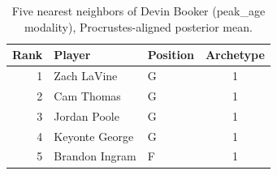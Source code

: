 \begin{table}[htbp]
  \centering\small
  \begin{tabular}{rllc}
    \toprule
    Rank & Player & Position & Archetype \\
    \midrule
    1 & Zach LaVine & G & 1 \\
    2 & Cam Thomas & G & 1 \\
    3 & Jordan Poole & G & 1 \\
    4 & Keyonte George & G & 1 \\
    5 & Brandon Ingram & F & 1 \\
    \bottomrule
  \end{tabular}
  \caption{Five nearest neighbors of Devin Booker (peak_age modality), Procrustes-aligned posterior mean.}
  \label{tab:Devin_Booker_neighbors_peak_age}
\end{table}

